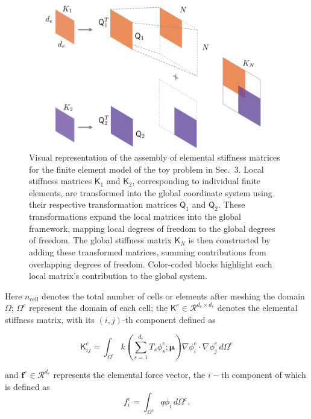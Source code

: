 \documentclass[11pt]{article}
\renewcommand{\vec}[1]{\mathbf{#1}}
\newcommand{\mat}[1]{\mathsf{#1}}
\begin{document}
    \begin{figure}[t]
            \centering
            \includegraphics[width=0.6\linewidth]{K_full.pdf}
            \caption{Visual representation of the assembly of elemental stiffness matrices for the finite element model of the toy problem in Sec.~3. Local stiffness matrices \( \mat{K}_1 \) and \( \mat{K}_2 \), corresponding to individual finite elements, are transformed into the global coordinate system using their respective transformation matrices \( \mat{Q}_1 \) and \( \mat{Q}_2 \). These transformations expand the local matrices into the global framework, mapping local degrees of freedom to the global degrees of freedom. The global stiffness matrix \( \mat{K}_N \) is then constructed by adding these transformed matrices, summing contributions from overlapping degrees of freedom. Color-coded blocks highlight each local matrix's contribution to the global system.}
            \label{fig:visual_FOM_FEA}
    \end{figure}


    Here \( n_{\text{cell}} \) denotes the total number of cells or elements after meshing the domain \( \Omega \);  \( \Omega^e \) represent the domain of each cell; the \( \mat{K}^e\in\mathcal{R}^{d_e\times d_e} \) denotes the elemental stiffness matrix, with its $(i,j)$-th component defined as

    \begin{equation}
    \mat{K}^e_{ij} = \int_{\Omega^{e}} k\left(\sum_{s=1}^{d_e} T_s \phi^e_s;\boldsymbol\mu\right) \nabla \phi^e_i \cdot \nabla \phi^e_j \, d\Omega^{e}
    \label{eq:K_N_ij}
    \end{equation}

    and \( \vec{f}^e\in\mathcal{R}^{d_e} \) represents the elemental force vector, the $i-$th component of which is defined as
    \begin{equation}
    {f}^e_i = \int_{{\Omega}^e} q \phi_i \, d\Omega^{e}.
    \label{eq:f_N_ij}
    \end{equation}
\end{document}
